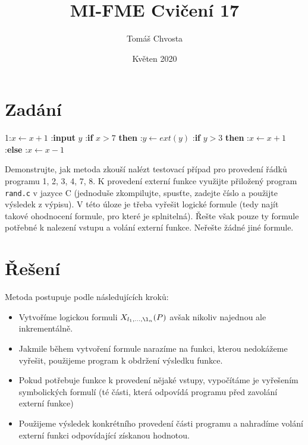 \documentclass{article}
\title{MI-FME Cvičení 17}
\author{Tomáš Chvosta}
\date{Květen 2020}
\newcommand\tab[1][0.5cm]{\hspace*{#1}}
\begin{document}
\maketitle

\section{Zadání}

1:\tab $x \leftarrow x + 1$ :\tab \textbf{input} $y$ :\tab \textbf{if} $x > 7$ \textbf{then} :\tab\tab $y \leftarrow ext(y)$ :\tab\tab \textbf{if} $y > 3$ \textbf{then} :\tab\tab\tab $x \leftarrow x + 1$ :\tab\tab \textbf{else} :\tab\tab\tab $x \leftarrow x - 1$ \newline

Demonstrujte, jak metoda  zkouší nalézt testovací případ pro provedení řádků programu 1, 2, 3, 4, 7, 8. K provedení externí funkce využijte přiložený program \texttt{rand.c} v jazyce C (jednoduše zkompilujte, spusťte, zadejte číslo a použijte výsledek z výpisu). V této úloze je třeba vyřešit logické formule (tedy najít takové ohodnocení formule, pro které je splnitelná). Řešte však pouze ty formule potřebné k nalezení vstupu a volání externí funkce. Neřešte žádné jiné formule.

\section{Řešení}
Metoda  postupuje podle následujících kroků:

\begin{itemize}
    \item Vytvoříme logickou formuli $X_{l_1,\dots,\l_n}(P)$ avšak nikoliv najednou ale inkrementálně.
    \item Jakmile během vytvoření formule narazíme na funkci, kterou nedokážeme vyřešit, použijeme program k obdržení výsledku funkce.
    \item Pokud potřebuje funkce k provedení nějaké vstupy, vypočítáme je vyřešením symbolických formulí (té části, která odpovídá programu před zavolání externí funkce) 
    \item Použijeme výsledek konkrétního provedení části programu a nahradíme volání externí funkci odpovídající získanou hodnotou. 
\end{itemize}
\end{document}
